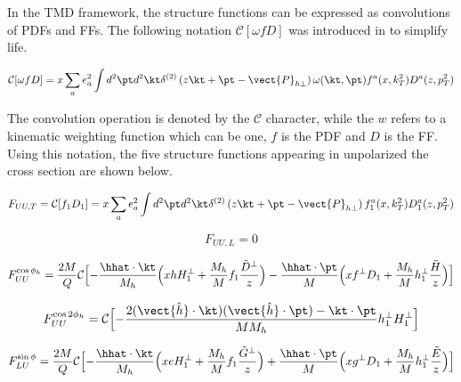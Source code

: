 In the TMD framework, the structure functions can be expressed as convolutions of PDFs and FFs.  The following notation $\mathcal{C}[\omega f D]$ was introduced in \cite{tmds-bacchetta:2006} to simplify life.

\begin{equation}
  \mathcal{C}[\omega f D] = x \sum_{a} e^{2}_{a} \int d^{2}\pt d^{2}\kt \delta^{(2)} \left( z\kt + \pt - \vect{P}_{h\perp} \right) \omega (\kt, \pt) f^{a}(x, k_{T}^{2}) D^{a}(z, p_{T}^{2}) 
  \label{eqn:convolution}
\end{equation}

The convolution operation is denoted by the $\mathcal{C}$ character, while the $w$ refers to a kinematic weighting function which can be one, $f$ is the PDF and $D$ is the FF.  Using this notation, the five structure functions appearing in unpolarized the cross section are shown below.

\begin{equation}
F_{UU,T} = \mathcal{C}[f_1 D_1] = x \sum_{a} e^{2}_{a} \int d^{2} \pt d^{2} \kt \delta^{(2)} \left( z\kt + \pt - \vect{P}_{h\perp} \right) f_{1}^{a}(x, k_{T}^{2}) D_{1}^{a}(z, p_{T}^{2})
\end{equation}

\begin{equation}
F_{UU,L} = 0
\end{equation}

\begin{equation}
  F_{UU}^{\cos \phi_h} = \frac{2M}{Q} \mathcal{C} \Bigl[ - \frac{\hhat \cdot \kt}{M_h} \Bigl( x h H_{1}^{\perp} + 
    \frac{M_h}{M} f_1 \frac{\tilde{D}^{\perp}}{z} \Bigr) -
    \frac{\hhat \cdot \pt}{M} \Bigl( x f^{\perp} D_1 + \frac{M_h}{M} h_1^{\perp} \frac{\tilde{H}}{z} \Bigr)\Bigr]
\end{equation}

\begin{equation}
F_{UU}^{\cos 2\phi_h} = \mathcal{C} \Bigl[ - \frac{2 (\vect{\hat{h}} \cdot \kt) (\vect{\hat{h}} \cdot \pt) - \kt \cdot \pt}{M M_h} h_{1}^{\perp} H_{1}^{\perp} \Bigr]
\end{equation}

\begin{equation}
  F_{LU}^{\sin\phi} = \frac{2M}{Q} \mathcal{C} \Bigl[ -\frac{\hhat \cdot \kt}{M_h} \Bigl( xeH_1^\perp + \frac{M_h}{M} f_1 \frac{\tilde{G}^\perp}{z} \Bigr) + 
    \frac{\hhat \cdot \pt}{M} \Bigl( xg^\perp D_1 + \frac{M_h}{M} h_{1}^{\perp} \frac{\tilde{E}}{z} \Bigr) \Bigr]
\end{equation}

